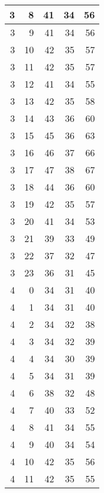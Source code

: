 \begin{longtable}{|r|r|r|r|r|}
    \hline
    3     & 8     & 41    & 34    & 56 \\
    \hline
    3     & 9     & 41    & 34    & 56 \\
    \hline
    3     & 10    & 42    & 35    & 57 \\
    \hline
    3     & 11    & 42    & 35    & 57 \\
    \hline
    3     & 12    & 41    & 34    & 55 \\
    \hline
    3     & 13    & 42    & 35    & 58 \\
    \hline
    3     & 14    & 43    & 36    & 60 \\
    \hline
    3     & 15    & 45    & 36    & 63 \\
    \hline
    3     & 16    & 46    & 37    & 66 \\
    \hline
    3     & 17    & 47    & 38    & 67 \\
    \hline
    3     & 18    & 44    & 36    & 60 \\
    \hline
    3     & 19    & 42    & 35    & 57 \\
    \hline
    3     & 20    & 41    & 34    & 53 \\
    \hline
    3     & 21    & 39    & 33    & 49 \\
    \hline
    3     & 22    & 37    & 32    & 47 \\
    \hline
    3     & 23    & 36    & 31    & 45 \\
    \hline
    4     & 0     & 34    & 31    & 40 \\
    \hline
    4     & 1     & 34    & 31    & 40 \\
    \hline
    4     & 2     & 34    & 32    & 38 \\
    \hline
    4     & 3     & 34    & 32    & 39 \\
    \hline
    4     & 4     & 34    & 30    & 39 \\
    \hline
    4     & 5     & 34    & 31    & 39 \\
    \hline
    4     & 6     & 38    & 32    & 48 \\
    \hline
    4     & 7     & 40    & 33    & 52 \\
    \hline
    4     & 8     & 41    & 34    & 55 \\
    \hline
    4     & 9     & 40    & 34    & 54 \\
    \hline
    4     & 10    & 42    & 35    & 56 \\
    \hline
    4     & 11    & 42    & 35    & 55 \\

\end{longtable}
